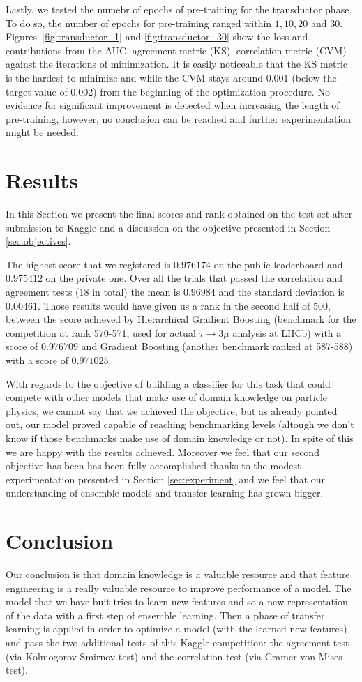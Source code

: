 \documentclass[conference]{IEEEtran}
\begin{document}
Lastly, we tested the numebr of epochs of pre-training for the transductor
phase. To do so, the number of epochs for pre-training ranged within $1, 10, 20$
and $30$. Figures~\ref{fig:transductor_1} and \ref{fig:transductor_30} show the
loss and contributions from the AUC, agreement metric (KS), correlation metric
(CVM) against the iterations of minimization. It is easily noticeable that the
KS metric is the hardest to minimize and while the CVM stays around 0.001 (below
the target value of 0.002) from the beginning of the optimization procedure. No
evidence for significant improvement is detected when increasing the length of
pre-training, however, no conclusion can be reached and further experimentation
might be needed.


\section{Results}
\label{sec:results}
In this Section we present the final scores and rank obtained on the test set
after submission to Kaggle and a discussion on the objective presented in
Section \ref{sec:objectives}.

The highest score that we registered is $0.976174$ on the public leaderboard and
$0.975412$ on the private one. Over all the trials that passed the correlation
and agreement tests (18 in total) the mean is $0.96984$ and the standard
deviation is $0.00461$. Those results would have given us a rank in the second
half of 500, between the score achieved by Hierarchical Gradient Boosting
(benchmark for the competition at rank 570-571, used for actual $\tau
\rightarrow 3\mu$ analysis at LHCb) with a score of $0.976709$ and Gradient
Boosting (another benchmark ranked at 587-588) with a score of $0.971025$.

With regards to the objective of building a classifier for this task that could
compete with other models that make use of domain knowledge on particle physics,
we cannot say that we achieved the objective, but as already pointed out, our
model proved capable of reaching benchmarking levels (altough we don't know if
those benchmarks make use of domain knowledge or not). In spite of this we are
happy with the results achieved. Moreover we feel that our second objective has
been has been fully accomplished thanks to the modest experimentation presented
in Section \ref{sec:experiment} and we feel that our understanding of ensemble
models and transfer learning has grown bigger.


\section{Conclusion}
\label{sec:conclusion}
Our conclusion is that domain knowledge is a valuable resource and that feature
engineering is a really valuable resource to improve performance of a model. The
model that we have buit tries to learn new features and so a new representation
of the data with a first step of ensemble learning. Then a phase of transfer
learning is applied in order to optimize a model (with the learned new features)
and pass the two additional tests of this Kaggle competition: the agreement test
(via Kolmogorov-Smirnov test) and the correlation test (via Cramer-von Mises
test).
\end{document}
